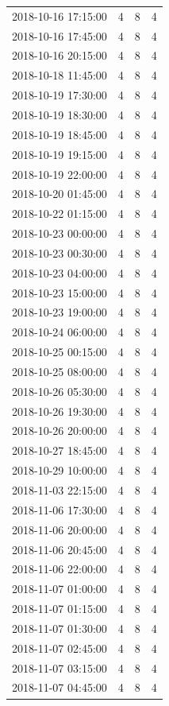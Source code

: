 \begin{tabular}{lrrr}
2018-10-16 17:15:00 & 4 & 8 & 4 \\
2018-10-16 17:45:00 & 4 & 8 & 4 \\
2018-10-16 20:15:00 & 4 & 8 & 4 \\
2018-10-18 11:45:00 & 4 & 8 & 4 \\
2018-10-19 17:30:00 & 4 & 8 & 4 \\
2018-10-19 18:30:00 & 4 & 8 & 4 \\
2018-10-19 18:45:00 & 4 & 8 & 4 \\
2018-10-19 19:15:00 & 4 & 8 & 4 \\
2018-10-19 22:00:00 & 4 & 8 & 4 \\
2018-10-20 01:45:00 & 4 & 8 & 4 \\
2018-10-22 01:15:00 & 4 & 8 & 4 \\
2018-10-23 00:00:00 & 4 & 8 & 4 \\
2018-10-23 00:30:00 & 4 & 8 & 4 \\
2018-10-23 04:00:00 & 4 & 8 & 4 \\
2018-10-23 15:00:00 & 4 & 8 & 4 \\
2018-10-23 19:00:00 & 4 & 8 & 4 \\
2018-10-24 06:00:00 & 4 & 8 & 4 \\
2018-10-25 00:15:00 & 4 & 8 & 4 \\
2018-10-25 08:00:00 & 4 & 8 & 4 \\
2018-10-26 05:30:00 & 4 & 8 & 4 \\
2018-10-26 19:30:00 & 4 & 8 & 4 \\
2018-10-26 20:00:00 & 4 & 8 & 4 \\
2018-10-27 18:45:00 & 4 & 8 & 4 \\
2018-10-29 10:00:00 & 4 & 8 & 4 \\
2018-11-03 22:15:00 & 4 & 8 & 4 \\
2018-11-06 17:30:00 & 4 & 8 & 4 \\
2018-11-06 20:00:00 & 4 & 8 & 4 \\
2018-11-06 20:45:00 & 4 & 8 & 4 \\
2018-11-06 22:00:00 & 4 & 8 & 4 \\
2018-11-07 01:00:00 & 4 & 8 & 4 \\
2018-11-07 01:15:00 & 4 & 8 & 4 \\
2018-11-07 01:30:00 & 4 & 8 & 4 \\
2018-11-07 02:45:00 & 4 & 8 & 4 \\
2018-11-07 03:15:00 & 4 & 8 & 4 \\
2018-11-07 04:45:00 & 4 & 8 & 4 \\

\end{tabular}
